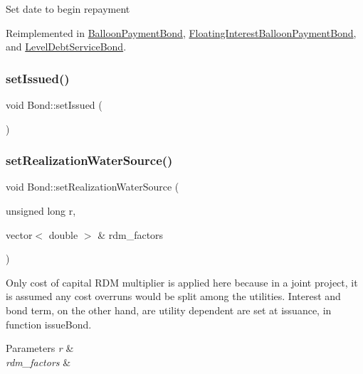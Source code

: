 Set date to begin repayment 

Reimplemented in \mbox{\hyperlink{classBalloonPaymentBond_af22552acd74b08dbb1d308cc5e45344c}{Balloon\+Payment\+Bond}}, \mbox{\hyperlink{classFloatingInterestBalloonPaymentBond_a4cf110f320c92f5eca9aed952e0b527a}{Floating\+Interest\+Balloon\+Payment\+Bond}}, and \mbox{\hyperlink{classLevelDebtServiceBond_a51a54a1a25be105b168bf86489aee417}{Level\+Debt\+Service\+Bond}}.

\mbox{\label{classBond_a573de514b0044cec6a76bb63b098b40a}} 
\subsubsection{\texorpdfstring{set\+Issued()}{setIssued()}}
{\footnotesize\ttfamily void Bond\+::set\+Issued (\begin{DoxyParamCaption}{ }\end{DoxyParamCaption})}

\mbox{\label{classBond_a19fd997eed14b4cb4151063c24a13cdd}} 
\subsubsection{\texorpdfstring{set\+Realization\+Water\+Source()}{setRealizationWaterSource()}}
{\footnotesize\ttfamily void Bond\+::set\+Realization\+Water\+Source (\begin{DoxyParamCaption}\item[{unsigned long}]{r,  }\item[{vector$<$ double $>$ \&}]{rdm\+\_\+factors }\end{DoxyParamCaption})\hspace{0.3cm}{\ttfamily [virtual]}}

Only cost of capital R\+DM multiplier is applied here because in a joint project, it is assumed any cost overruns would be split among the utilities. Interest and bond term, on the other hand, are utility dependent are set at issuance, in function issue\+Bond. 
\begin{DoxyParams}{Parameters}
{\em r} & \\
\hline
{\em rdm\+\_\+factors} & \\
\hline
\end{DoxyParams}


